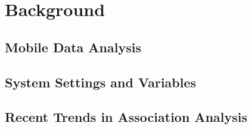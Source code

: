 \section{Background}

\subsection{Mobile Data Analysis}

\subsection{System Settings and Variables}

\subsection{Recent Trends in Association Analysis}